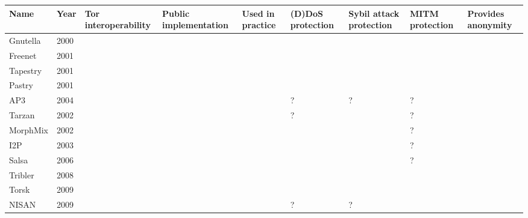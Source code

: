 \begin{tabular}[p]{| l | l | p{2.5cm} | p{2.5cm} | p{2.5cm} | p{2.5cm} | p{2.5cm} | p{2.5cm} | p{2.5cm} |}
	\hline
	\textbf{Name} & \textbf{Year} & \textbf{Tor interoperability} & \textbf{Public implementation} & \textbf{Used in \newline practice} & \textbf{(D)DoS protection} & \textbf{Sybil attack protection} & \textbf{MITM \newline protection} & \textbf{Provides \newline anonymity} \\ \hline

	Gnutella & 2000 & \xmark & \checkmark & \checkmark & \xmark & \xmark & \xmark & \xmark \\ \hline
	Freenet & 2001 & \xmark & \checkmark & \checkmark & \checkmark & \xmark & \xmark & \checkmark \\ \hline
	Tapestry & 2001 & \xmark & \checkmark & \checkmark & \checkmark & \xmark & \xmark & \xmark \\ \hline
	Pastry & 2001 & \xmark & \checkmark & \checkmark & \checkmark & \xmark & \xmark & \xmark \\ \hline
	AP3 & 2004 & \xmark & \xmark & \xmark & ? & ? & ? & \checkmark \\ \hline
	Tarzan & 2002 & \xmark & \xmark & \xmark & ? & \checkmark & ? & \checkmark \\ \hline
	MorphMix & 2002 & \xmark & \checkmark & \xmark & \checkmark & \xmark & ? & \checkmark \\ \hline
	I2P & 2003 & \xmark & \checkmark & \checkmark & \checkmark & \checkmark & ? & \checkmark\\ \hline
	Salsa & 2006 & \xmark & \xmark & \xmark & \checkmark & \checkmark & ? & \checkmark \\ \hline
	Tribler & 2008 & \xmark & \checkmark & \checkmark & \checkmark & \xmark & \xmark & \xmark \\ \hline
	Torsk & 2009 & \checkmark & \xmark & \xmark & \checkmark & \checkmark & \checkmark & \checkmark \\ \hline
	NISAN & 2009 & \xmark & \xmark & \xmark & ? & ? & \checkmark & \checkmark \\ \hline		
\end{tabular}
